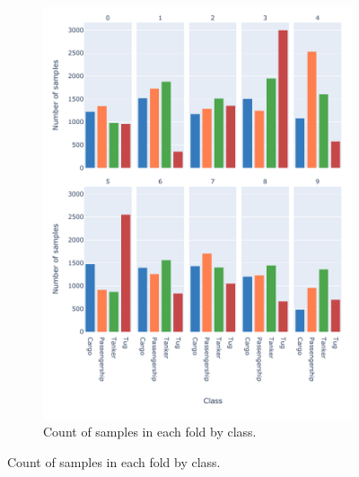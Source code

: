 \begin{figure}[htbp]
    \centering
    \begin{subfigure}{\textwidth}
        \centering
        \includegraphics[width=\textwidth]{img/ch3/deepship_figs/10_folds_counts_facet.pdf}
        \caption{Count of samples in each fold by class.}
        \label{fig:10-fold-counts}
    \end{subfigure}
\end{figure}
